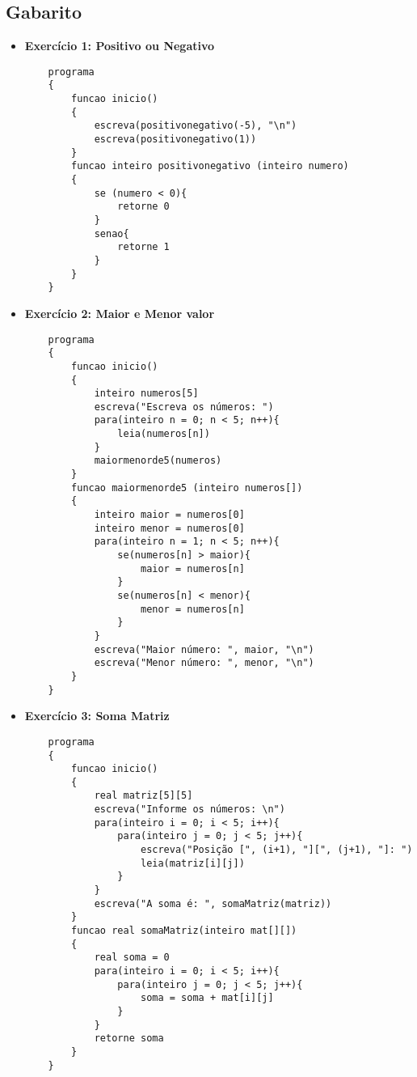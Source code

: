 \documentclass{article}
\begin{document}
\subsection*{Gabarito}
\begin{itemize}
    \item \textbf{Exercício 1: Positivo ou Negativo}
    \begin{lstlisting}
    programa
    {
        funcao inicio()
        {
            escreva(positivonegativo(-5), "\n")
            escreva(positivonegativo(1))
        }
        funcao inteiro positivonegativo (inteiro numero)
        {
            se (numero < 0){
                retorne 0
            }
            senao{
                retorne 1
            }
        }
    }
    \end{lstlisting}

    \item \textbf{Exercício 2: Maior e Menor valor}
    \begin{lstlisting}
    programa
    {
        funcao inicio()
        {
            inteiro numeros[5]
            escreva("Escreva os números: ")
            para(inteiro n = 0; n < 5; n++){
                leia(numeros[n])
            }
            maiormenorde5(numeros)
        }
        funcao maiormenorde5 (inteiro numeros[])
        {
            inteiro maior = numeros[0]
            inteiro menor = numeros[0]
            para(inteiro n = 1; n < 5; n++){
                se(numeros[n] > maior){
                    maior = numeros[n]
                }
                se(numeros[n] < menor){
                    menor = numeros[n]
                }
            }
            escreva("Maior número: ", maior, "\n")
            escreva("Menor número: ", menor, "\n")
        }
    }
    \end{lstlisting}

    \item \textbf{Exercício 3: Soma Matriz}
    \begin{lstlisting}
    programa
    {
        funcao inicio()
        {
            real matriz[5][5]
            escreva("Informe os números: \n")
            para(inteiro i = 0; i < 5; i++){
                para(inteiro j = 0; j < 5; j++){
                    escreva("Posição [", (i+1), "][", (j+1), "]: ")
                    leia(matriz[i][j])
                }
            }
            escreva("A soma é: ", somaMatriz(matriz))
        }
        funcao real somaMatriz(inteiro mat[][])
        {
            real soma = 0
            para(inteiro i = 0; i < 5; i++){
                para(inteiro j = 0; j < 5; j++){
                    soma = soma + mat[i][j]
                }
            }
            retorne soma
        }
    }
    \end{lstlisting}


\end{itemize}
\end{document}
